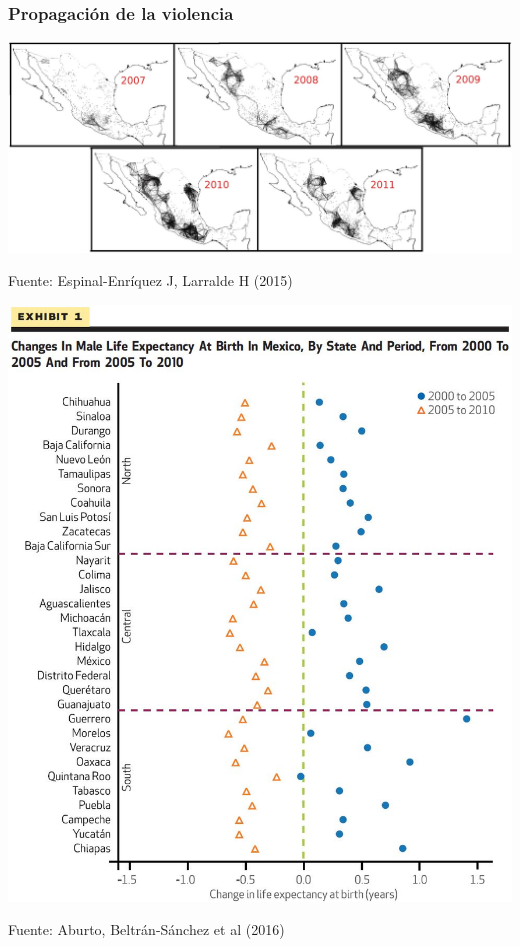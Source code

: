 \documentclass[xcolor={dvipsnames}]{beamer}
\begin{document}
\begin{frame} \frametitle{Propagaci\'on de la violencia}
\begin{center}
		\includegraphics[scale=.72]{Figures/map1}
				\end{center}
				\tiny{Fuente: Espinal-Enr\'iquez J, Larralde H (2015)}
\end{frame}

\begin{frame}

\begin{center}
		\includegraphics[scale=.24]{Figures/Fig3}
				\end{center}			
								\tiny{Fuente: Aburto, Beltr\'an-S\'anchez et al (2016)}
		

\end{frame}
\end{document}
